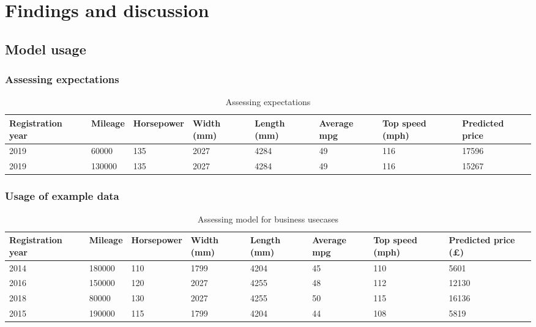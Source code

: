 \chapter{Findings and discussion}

\section{Model usage}
\subsection{Assessing expectations}
\begin{table}[H]
    \begin{adjustbox}{width={\textwidth}}
        \begin{tabular}{|l|l|l|l|l|l|l|l|}
            \hline
            Registration year & Mileage & Horsepower & Width (mm) & Length (mm) & Average mpg & Top speed (mph) & Predicted price \\ \hline
            2019              & 60000   & 135        & 2027       & 4284        & 49          & 116             & 17596           \\\hline
            2019              & 130000  & 135        & 2027       & 4284        & 49          & 116             & 15267           \\\hline
        \end{tabular}
    \end{adjustbox}
    \caption{Assessing expectations}
    \label{table_data}
\end{table}
\subsection{Usage of example data}
\begin{table}[H]
    \begin{adjustbox}{width={\textwidth}}

        \begin{tabular}{|l|l|l|l|l|l|l|l|}
            \hline
            Registration year & Mileage & Horsepower & Width (mm) & Length (mm) & Average mpg & Top speed (mph) & Predicted price (£) \\\hline
            2014              & 180000  & 110        & 1799       & 4204        & 45          & 110             & 5601                \\\hline
            2016              & 150000  & 120        & 2027       & 4255        & 48          & 112             & 12130               \\\hline
            2018              & 80000   & 130        & 2027       & 4255        & 50          & 115             & 16136               \\\hline
            2015              & 190000  & 115        & 1799       & 4204        & 44          & 108             & 5819                \\ \hline
        \end{tabular}
    \end{adjustbox}
    \caption{Assessing model for business usecases}
    \label{table_data}
\end{table}
